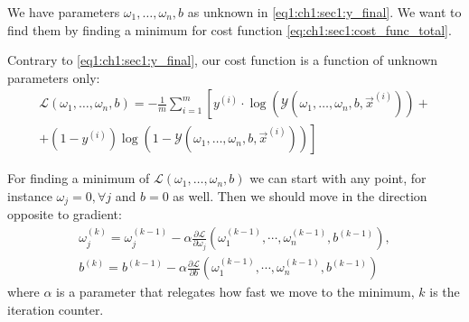 We have parameters $\omega_1, \dots, \omega_n, b$ as unknown in
\cref{eq1:ch1:sec1:y_final}. We want to find them by finding a minimum for cost
function \cref{eq:ch1:sec1:cost_func_total}.

Contrary to \cref{eq1:ch1:sec1:y_final}, our cost function is a function of
unknown parameters only:
\begin{align}
  \mathcal{L}\left(\omega_1, \dots, \omega_n, b\right) = - \frac{1}{m} \sum_{i =
    1}^{m} \left[ y^{(i)} \cdot \log \left(\mathcal{Y}\left(\omega_1, \dots, \omega_n, b,
    \vec{x}^{(i)}\right)\right) + \right.
    \nonumber \\
    \left. + 
(1-y^{(i)}) \log \left(1 - \mathcal{Y}\left(\omega_1, \dots, \omega_n, b, \vec{x}^{(i)}\right)\right)\right]
  \label{eq:ch1:sec1:cost_func_total_params}
\end{align}

For finding a minimum of $\mathcal{L}\left(\omega_1, \dots, \omega_n, b\right)$
we can start with any point, for instance $\omega_j = 0, \forall j$ and $b = 0$
as well. Then we should move in the direction opposite to gradient:
\begin{align}
  \omega_j^{(k)} = \omega_j^{(k-1)} - \alpha \frac{\partial
    \mathcal{L}}{\partial \omega_j}\left(\omega_1^{(k-1)}, \cdots,
  \omega_n^{(k-1)}, b^{(k-1)}\right),
  \nonumber \\
  b^{(k)} = b^{(k-1)}  - \alpha \frac{\partial
    \mathcal{L}}{\partial b}\left(\omega_1^{(k-1)}, \cdots,
  \omega_n^{(k-1)}, b^{(k-1)}\right)
  \nonumber
\end{align}
where $\alpha$ is a parameter that relegates how fast we move to the minimum,
$k$ is the iteration counter.

